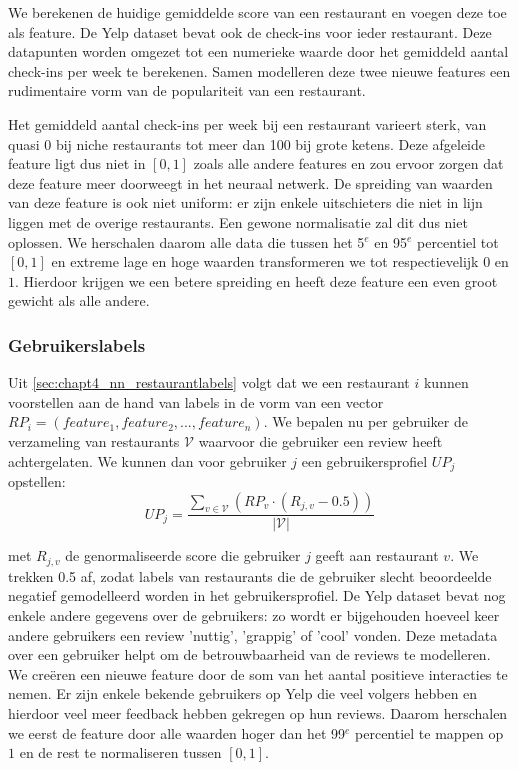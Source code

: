 We berekenen de huidige gemiddelde score van een restaurant en voegen deze toe als feature. De Yelp dataset bevat ook de check-ins voor ieder restaurant. Deze datapunten worden omgezet tot een numerieke waarde door het gemiddeld aantal check-ins per week te berekenen. Samen modelleren deze twee nieuwe features een rudimentaire vorm van de populariteit van een restaurant.

Het gemiddeld aantal check-ins per week bij een restaurant varieert sterk, van quasi 0 bij niche restaurants tot meer dan 100 bij grote ketens. Deze afgeleide feature ligt dus niet in $[0, 1]$ zoals alle andere features en zou ervoor zorgen dat deze feature meer doorweegt in het neuraal netwerk. De spreiding van waarden van deze feature is ook niet uniform: er zijn enkele uitschieters die niet in lijn liggen met de overige restaurants. Een gewone normalisatie zal dit dus niet oplossen. We herschalen daarom alle data die tussen het 5$^e$ en 95$^e$ percentiel tot $[0, 1]$ en extreme lage en hoge waarden transformeren we tot respectievelijk $0$ en $1$. Hierdoor krijgen we een betere spreiding en heeft deze feature een even groot gewicht als alle andere.

\subsubsection{Gebruikerslabels}
Uit \autoref{sec:chapt4_nn_restaurantlabels} volgt dat we een restaurant $i$ kunnen voorstellen aan de hand van labels in de vorm van een vector $RP_i = (feature_1, feature_2, ..., feature_n)$. We bepalen nu per gebruiker de verzameling van restaurants $\mathcal{V}$ waarvoor die gebruiker een review heeft achtergelaten. We kunnen dan voor gebruiker $j$ een gebruikersprofiel $UP_j$ opstellen:
\begin{equation}
    UP_j = \frac{\sum_{v \in \mathcal{V}} \left(RP_v \cdot (R_{j, v} - 0.5)\right)}{\vert \mathcal{V} \vert}
\end{equation}

met $R_{j, v}$ de genormaliseerde score die gebruiker $j$ geeft aan restaurant $v$. We trekken 0.5 af, zodat labels van restaurants die de gebruiker slecht beoordeelde negatief gemodelleerd worden in het gebruikersprofiel.  De Yelp dataset bevat nog enkele andere gegevens over de gebruikers: zo wordt er bijgehouden hoeveel keer andere gebruikers een review 'nuttig', 'grappig' of 'cool' vonden. Deze metadata over een gebruiker helpt om de betrouwbaarheid van de reviews te modelleren. We creëren een nieuwe feature door de som van het aantal positieve interacties te nemen. Er zijn enkele bekende gebruikers op Yelp die veel volgers hebben en hierdoor veel meer feedback hebben gekregen op hun reviews. Daarom herschalen we eerst de feature door alle waarden hoger dan het 99$^e$ percentiel te mappen op $1$ en de rest te normaliseren tussen $[0, 1]$.

